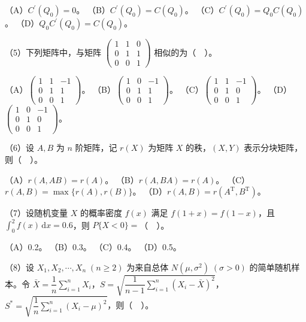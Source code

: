 \documentclass[UTF8,12pt]{ctexart}
\begin{document}
（A）\(\displaystyle C^{\prime}(Q_0)=0\)。 （B）\(\displaystyle C^{\prime}(Q_0)=C(Q_0)\)。 （C）\(\displaystyle C^{\prime}(Q_0)=Q_0C(Q_0)\)。 （D）\(\displaystyle Q_0C^{\prime}(Q_0)=C(Q_0)\)。


（5）下列矩阵中，与矩阵 \(\displaystyle \begin{pmatrix}1&1&0\\0&1&1\\0&0&1\end{pmatrix}\) 相似的为（　）。


（A）\(\displaystyle \begin{pmatrix}1&1&-1\\0&1&1\\0&0&1\end{pmatrix}\)。 （B）\(\displaystyle \begin{pmatrix}1&0&-1\\0&1&1\\0&0&1\end{pmatrix}\)。 （C）\(\displaystyle \begin{pmatrix}1&1&-1\\0&1&0\\0&0&1\end{pmatrix}\)。 （D）\(\displaystyle \begin{pmatrix}1&0&-1\\0&1&0\\0&0&1\end{pmatrix}\)。


（6）设 \(\displaystyle A,\allowbreak B\) 为 \(\displaystyle n\) 阶矩阵，记 \(\displaystyle r(X)\) 为矩阵 \(\displaystyle X\) 的秩，\(\displaystyle (X,\allowbreak Y)\) 表示分块矩阵，则（　）。


（A）\(\displaystyle r(A,\allowbreak AB)=r(A)\)。 （B）\(\displaystyle r(A,\allowbreak BA)=r(A)\)。 （C）\(\displaystyle r(A,\allowbreak B)=\displaystyle \max\{r(A),\allowbreak r(B)\}\)。 （D）\(\displaystyle r(A,\allowbreak B)=r(A^{\mathrm T},\allowbreak B^{\mathrm T})\)。


（7）设随机变量 \(\displaystyle X\) 的概率密度 \(\displaystyle f(x)\) 满足 \(\displaystyle f(1+x)=f(1-x)\)，且 \(\displaystyle \int_0^2f(x)\,\mathrm dx=0.6\)，则 \(\displaystyle P\{X<0\}=\)（　）。


（A）0.2。 （B）0.3。 （C）0.4。 （D）0.5。


（8）设 \(\displaystyle X_1,\allowbreak X_2,\allowbreak \cdots,\allowbreak X_n\;(n\ge2)\) 为来自总体 \(\displaystyle N(\mu,\allowbreak \sigma^2)\;(\sigma>0)\) 的简单随机样本。令 \(\displaystyle \bar X=\dfrac{\displaystyle 1}{\displaystyle n}\displaystyle \sum_{i=1}^nX_i\)，\(\displaystyle S=\sqrt{\dfrac{\displaystyle 1}{\displaystyle n-1}\displaystyle \sum_{i=1}^n(X_i-\bar X)^2}\)，\(\displaystyle S^*=\sqrt{\dfrac{\displaystyle 1}{\displaystyle n}\displaystyle \sum_{i=1}^n(X_i-\mu)^2}\)，则（　）。
\end{document}
